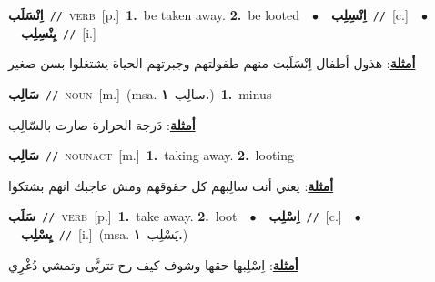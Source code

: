 \documentclass[10pt,a4paper,twoside]{article} %
\begin{document}
\begin{multicols}{2}
{\setlength\topsep{0pt}\textbf{\foreignlanguage{arabic}{اِنْسَلَب}}\ {\color{gray}\texttt{//}\color{black}}\ \textsc{verb}\ [p.]\ \textbf{1.}~be taken away.  \textbf{2.}~be looted\ \ $\bullet$\ \ \setlength\topsep{0pt}\textbf{\foreignlanguage{arabic}{اِنْسِلِب}}\ {\color{gray}\texttt{//}\color{black}}\ [c.]\ \ $\bullet$\ \ \setlength\topsep{0pt}\textbf{\foreignlanguage{arabic}{يِنْسِلِب}}\ {\color{gray}\texttt{//}\color{black}}\ [i.]\  \begin{flushright}\color{gray}\foreignlanguage{arabic}{\textbf{\underline{\foreignlanguage{arabic}{أمثلة}}}: هذول أطفال اِنْسَلَبت منهم طفولتهم وجبرتهم الحياة يشتغلوا بسن صغير}\end{flushright}\color{black}} \vspace{2mm}

{\setlength\topsep{0pt}\textbf{\foreignlanguage{arabic}{سَالِب}}\ {\color{gray}\texttt{//}\color{black}}\ \textsc{noun}\ [m.]\ \color{gray}(msa. \foreignlanguage{arabic}{سالِب}~\foreignlanguage{arabic}{\textbf{١.}})\color{black}\ \textbf{1.}~minus\  \begin{flushright}\color{gray}\foreignlanguage{arabic}{\textbf{\underline{\foreignlanguage{arabic}{أمثلة}}}: دَرجة الحرارة صارت بالسّالِب}\end{flushright}\color{black}} \vspace{2mm}

{\setlength\topsep{0pt}\textbf{\foreignlanguage{arabic}{سَالِب}}\ {\color{gray}\texttt{//}\color{black}}\ \textsc{noun\textunderscore act}\ [m.]\ \textbf{1.}~taking away.  \textbf{2.}~looting\  \begin{flushright}\color{gray}\foreignlanguage{arabic}{\textbf{\underline{\foreignlanguage{arabic}{أمثلة}}}: يعني أنت سالِبهم كل حقوقهم ومش عاجبك انهم بشتكوا}\end{flushright}\color{black}} \vspace{2mm}

{\setlength\topsep{0pt}\textbf{\foreignlanguage{arabic}{سَلَب}}\ {\color{gray}\texttt{//}\color{black}}\ \textsc{verb}\ [p.]\ \textbf{1.}~take away.  \textbf{2.}~loot\ \ $\bullet$\ \ \setlength\topsep{0pt}\textbf{\foreignlanguage{arabic}{اِسْلِب}}\ {\color{gray}\texttt{//}\color{black}}\ [c.]\ \ $\bullet$\ \ \setlength\topsep{0pt}\textbf{\foreignlanguage{arabic}{يِسْلِب}}\ {\color{gray}\texttt{//}\color{black}}\ [i.]\ \color{gray}(msa. \foreignlanguage{arabic}{يَسْلِب}~\foreignlanguage{arabic}{\textbf{١.}})\color{black}\  \begin{flushright}\color{gray}\foreignlanguage{arabic}{\textbf{\underline{\foreignlanguage{arabic}{أمثلة}}}: اِسْلِبها حقها وشوف كيف رح تتربَّى وتمشي دُغْرِي}\end{flushright}\color{black}} \vspace{2mm}


\end{multicols}
\end{document}

